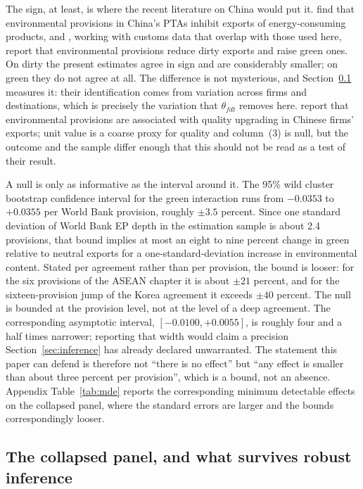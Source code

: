 \documentclass[12pt]{article}
\begin{document}
The sign, at least, is where the recent literature on China would put it. \citet{yue2024} find that
environmental provisions in China's PTAs inhibit exports of energy-consuming products, and
\citet{zhusun2026}, working with customs data that overlap with those used here, report that
environmental provisions reduce dirty exports and raise green ones. On dirty the present estimates
agree in sign and are considerably smaller; on green they do not agree at all. The difference is not
mysterious, and Section~\ref{sec:collapsed} measures it: their identification comes from variation
across firms and destinations, which is precisely the variation that $\theta_{fdt}$ removes here.
\citet{zhusun2025} report that environmental provisions are associated with quality upgrading in
Chinese firms' exports; unit value is a coarse proxy for quality and column~(3) is null, but the
outcome and the sample differ enough that this should not be read as a test of their result.

A null is only as informative as the interval around it. The 95\% wild cluster bootstrap confidence
interval for the green interaction runs from $-0.0353$ to $+0.0355$ per World Bank provision, roughly
$\pm 3.5$ percent. Since one standard deviation of World Bank EP depth in the estimation sample is
about 2.4 provisions, that bound implies at most an eight to nine percent change in green relative to
neutral exports for a one-standard-deviation increase in environmental content. Stated per agreement rather than per provision, the bound is looser: for the six provisions of the
ASEAN chapter it is about $\pm 21$ percent, and for the sixteen-provision jump of the Korea agreement
it exceeds $\pm 40$ percent. The null is bounded at the provision level, not at the level of a deep
agreement. The corresponding
asymptotic interval, $[-0.0100, +0.0055]$, is roughly four and a half times narrower; reporting that width would
claim a precision Section~\ref{sec:inference} has already declared unwarranted. The statement this
paper can defend is therefore not ``there is no effect'' but ``any effect is smaller than about three
percent per provision'', which is a bound, not an absence. Appendix Table~\ref{tab:mde} reports the
corresponding minimum detectable effects on the collapsed panel, where the standard errors are larger
and the bounds correspondingly looser.



\FloatBarrier
\subsection{The collapsed panel, and what survives robust inference}\label{sec:collapsed}
\end{document}
